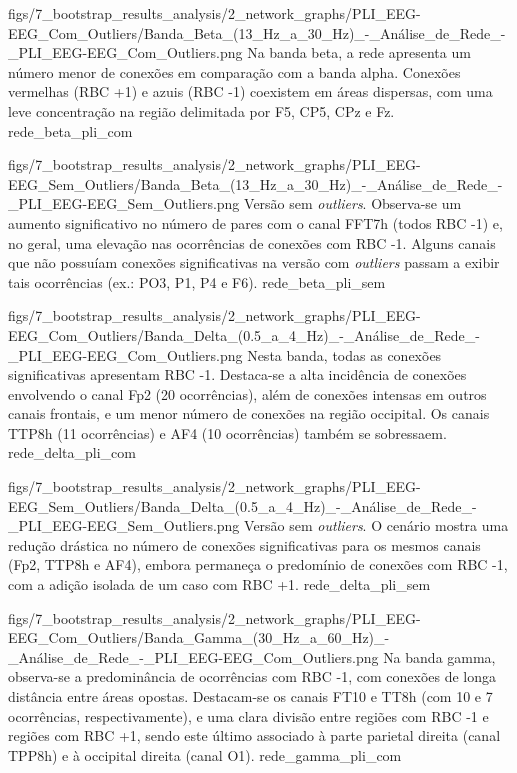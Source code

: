 \ultrawidefigure
{figs/7_bootstrap_results_analysis/2_network_graphs/PLI_EEG-EEG_Com_Outliers/Banda_Beta_(13_Hz_a_30_Hz)_-_Análise_de_Rede_-_PLI_EEG-EEG_Com_Outliers.png}
{Na banda beta, a rede apresenta um número menor de conexões em comparação com a banda alpha. Conexões vermelhas (RBC +1) e azuis (RBC -1) coexistem em áreas dispersas, com uma leve concentração na região delimitada por F5, CP5, CPz e Fz.}
{rede_beta_pli_com}

\ultrawidefigure
{figs/7_bootstrap_results_analysis/2_network_graphs/PLI_EEG-EEG_Sem_Outliers/Banda_Beta_(13_Hz_a_30_Hz)_-_Análise_de_Rede_-_PLI_EEG-EEG_Sem_Outliers.png}
{Versão sem \textit{outliers}. Observa-se um aumento significativo no número de pares com o canal FFT7h (todos RBC -1) e, no geral, uma elevação nas ocorrências de conexões com RBC -1. Alguns canais que não possuíam conexões significativas na versão com \textit{outliers} passam a exibir tais ocorrências (ex.: PO3, P1, P4 e F6).}
{rede_beta_pli_sem}

\ultrawidefigure
{figs/7_bootstrap_results_analysis/2_network_graphs/PLI_EEG-EEG_Com_Outliers/Banda_Delta_(0.5_a_4_Hz)_-_Análise_de_Rede_-_PLI_EEG-EEG_Com_Outliers.png}
{Nesta banda, todas as conexões significativas apresentam RBC -1. Destaca-se a alta incidência de conexões envolvendo o canal Fp2 (20 ocorrências), além de conexões intensas em outros canais frontais, e um menor número de conexões na região occipital. Os canais TTP8h (11 ocorrências) e AF4 (10 ocorrências) também se sobressaem.}
{rede_delta_pli_com}

\ultrawidefigure
{figs/7_bootstrap_results_analysis/2_network_graphs/PLI_EEG-EEG_Sem_Outliers/Banda_Delta_(0.5_a_4_Hz)_-_Análise_de_Rede_-_PLI_EEG-EEG_Sem_Outliers.png}
{Versão sem \textit{outliers}. O cenário mostra uma redução drástica no número de conexões significativas para os mesmos canais (Fp2, TTP8h e AF4), embora permaneça o predomínio de conexões com RBC -1, com a adição isolada de um caso com RBC +1.}
{rede_delta_pli_sem}

\ultrawidefigure
{figs/7_bootstrap_results_analysis/2_network_graphs/PLI_EEG-EEG_Com_Outliers/Banda_Gamma_(30_Hz_a_60_Hz)_-_Análise_de_Rede_-_PLI_EEG-EEG_Com_Outliers.png}
{Na banda gamma, observa-se a predominância de ocorrências com RBC -1, com conexões de longa distância entre áreas opostas. Destacam-se os canais FT10 e TT8h (com 10 e 7 ocorrências, respectivamente), e uma clara divisão entre regiões com RBC -1 e regiões com RBC +1, sendo este último associado à parte parietal direita (canal TPP8h) e à occipital direita (canal O1).}
{rede_gamma_pli_com}

